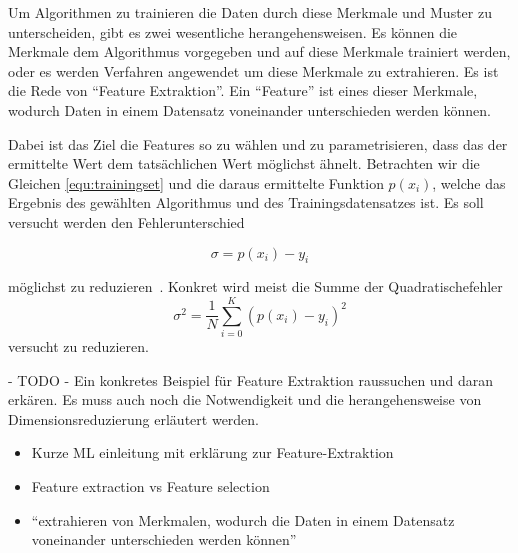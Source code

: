 Um Algorithmen zu trainieren die Daten durch diese Merkmale und Muster zu unterscheiden, gibt es zwei wesentliche herangehensweisen. Es können die Merkmale dem Algorithmus vorgegeben und auf diese Merkmale trainiert werden, oder es werden Verfahren angewendet um diese Merkmale zu extrahieren. Es ist die Rede von \enquote{Feature Extraktion}. Ein \enquote{Feature} ist eines dieser Merkmale, wodurch Daten in einem Datensatz voneinander unterschieden werden können. 

Dabei ist das Ziel die Features so zu wählen und zu parametrisieren, dass das der ermittelte Wert dem tatsächlichen Wert möglichst ähnelt. Betrachten wir die Gleichen \ref{equ:trainingset} und die daraus ermittelte Funktion $p(x_i)$, welche das Ergebnis des gewählten Algorithmus und des Trainingsdatensatzes ist. Es soll versucht werden den Fehlerunterschied

\begin{equation}
  \sigma = p(x_i)-y_i
\end{equation}

möglichst zu reduzieren~\cite{gensler2015fast}. Konkret wird meist die Summe der Quadratischefehler
\begin{equation}
  \sigma^2 = \frac{1}{N} \sum_{i=0}^{K}(p(x_i)-y_i)^2
\end{equation}
versucht zu reduzieren.

\begin{center}
  - TODO - Ein konkretes Beispiel für Feature Extraktion raussuchen und daran erkären. Es muss auch noch die Notwendigkeit und die herangehensweise von Dimensionsreduzierung erläutert werden.
\end{center}

\begin{itemize}
  \item Kurze ML einleitung mit erklärung zur Feature-Extraktion
  \item Feature extraction vs Feature selection
  \item \enquote{extrahieren von Merkmalen, wodurch die Daten in einem Datensatz voneinander unterschieden werden können}
\end{itemize}